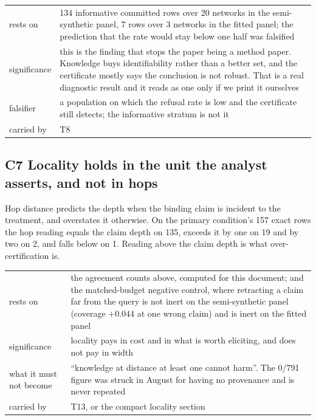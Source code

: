 \begin{center}\footnotesize
\begin{tabular}{@{}p{2.6cm}p{13.75cm}@{}}
\toprule
rests on & 134 informative committed rows over 20 networks in the semi-synthetic panel, 7 rows over
3 networks in the fitted panel; the prediction that the rate would stay below one half was
falsified \\
significance & this is the finding that stops the paper being a method paper. Knowledge buys
identifiability rather than a better set, and the certificate mostly says the conclusion is not
robust. That is a real diagnostic result and it reads as one only if we print it ourselves \\
falsifier & a population on which the refusal rate is low and the certificate still detects; the
informative stratum is not it \\
carried by & T8 \\
\bottomrule
\end{tabular}
\end{center}

\subsection*{C7 \quad Locality holds in the unit the analyst asserts, and not in hops}

Hop distance predicts the depth when the binding claim is incident to the treatment, and overstates
it otherwise. On the primary condition's 157 exact rows the hop reading equals the claim depth on
135, exceeds it by one on 19 and by two on 2, and falls below on 1. Reading above the claim depth
is what over-certification is.

\begin{center}\footnotesize
\begin{tabular}{@{}p{2.6cm}p{13.75cm}@{}}
\toprule
rests on & the agreement counts above, computed for this document; and the matched-budget negative
control, where retracting a claim far from the query is not inert on the semi-synthetic panel
(coverage $+0.044$ at one wrong claim) and is inert on the fitted panel \\
significance & locality pays in cost and in what is worth eliciting, and does not pay in width \\
what it must not become & ``knowledge at distance at least one cannot harm''. The 0/791 figure was
struck in August for having no provenance and is never repeated \\
carried by & T13, or the compact locality section \\
\bottomrule
\end{tabular}
\end{center}

